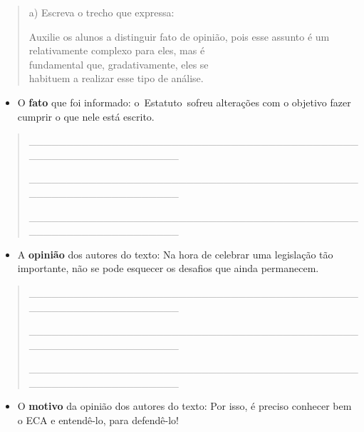\begin{quote}
a) Escreva o trecho que expressa:

Auxilie os alunos a distinguir fato de opinião, pois esse assunto é um
relativamente complexo para eles, mas é\\
fundamental que, gradativamente, eles se\\
habituem a realizar esse tipo de análise.
\end{quote}

\begin{itemize}
\item
  O \textbf{fato} que foi informado: o~Estatuto~sofreu alterações com o
  objetivo fazer cumprir o que nele está escrito.
\end{itemize}

\begin{quote}
\_\_\_\_\_\_\_\_\_\_\_\_\_\_\_\_\_\_\_\_\_\_\_\_\_\_\_\_\_\_\_\_\_\_\_\_\_\_\_\_\_\_\_\_\_\_\_\_\_\_\_\_\_\_\_\_\_\_\_\_\_\_\_\_

\_\_\_\_\_\_\_\_\_\_\_\_\_\_\_\_\_\_\_\_\_\_\_\_\_\_\_\_\_\_\_\_\_\_\_\_\_\_\_\_\_\_\_\_\_\_\_\_\_\_\_\_\_\_\_\_\_\_\_\_\_\_\_\_

\_\_\_\_\_\_\_\_\_\_\_\_\_\_\_\_\_\_\_\_\_\_\_\_\_\_\_\_\_\_\_\_\_\_\_\_\_\_\_\_\_\_\_\_\_\_\_\_\_\_\_\_\_\_\_\_\_\_\_\_\_\_\_\_
\end{quote}

\begin{itemize}
\item
  A \textbf{opinião} dos autores do texto: Na hora de celebrar uma
  legislação tão importante, não se pode esquecer os desafios que ainda
  permanecem.
\end{itemize}

\begin{quote}
\_\_\_\_\_\_\_\_\_\_\_\_\_\_\_\_\_\_\_\_\_\_\_\_\_\_\_\_\_\_\_\_\_\_\_\_\_\_\_\_\_\_\_\_\_\_\_\_\_\_\_\_\_\_\_\_\_\_\_\_\_\_\_\_

\_\_\_\_\_\_\_\_\_\_\_\_\_\_\_\_\_\_\_\_\_\_\_\_\_\_\_\_\_\_\_\_\_\_\_\_\_\_\_\_\_\_\_\_\_\_\_\_\_\_\_\_\_\_\_\_\_\_\_\_\_\_\_\_

\_\_\_\_\_\_\_\_\_\_\_\_\_\_\_\_\_\_\_\_\_\_\_\_\_\_\_\_\_\_\_\_\_\_\_\_\_\_\_\_\_\_\_\_\_\_\_\_\_\_\_\_\_\_\_\_\_\_\_\_\_\_\_\_
\end{quote}

\begin{itemize}
\item
  O \textbf{motivo} da opinião dos autores do texto: Por isso, é preciso
  conhecer bem o ECA e entendê-lo, para defendê-lo!
\end{itemize}

